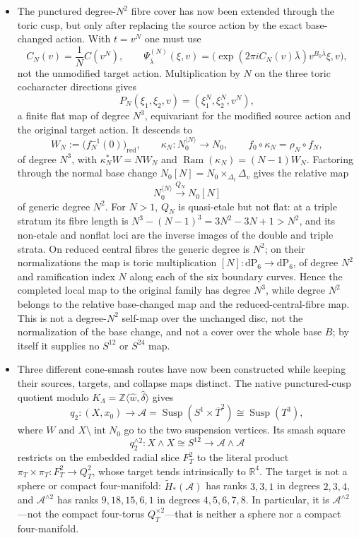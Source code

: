 \begin{itemize}[leftmargin=1.8em]
\item The punctured degree-$N^2$ fibre cover has now been extended through
the toric cusp, but only after replacing the source action by the exact
base-changed action.  With $t=v^N$ one must use
\[
 C_N(v)=\frac1N C(v^N),\qquad
 \Psi^{(N)}_{\bar\lambda}(\xi,v)
 =\bigl(\exp(2\pi iC_N(v)\bar\lambda)
         v^{B_0\bar\lambda}\xi,v\bigr),
\]
not the unmodified target action.  Multiplication by $N$ on the three
toric cocharacter directions gives
\[
 P_N(\xi_1,\xi_2,v)=(\xi_1^N,\xi_2^N,v^N),
\]
a finite flat map of degree $N^3$, equivariant for the modified source
action and the original target action.  It descends to
\[
 W_N:=\bigl(f_N^{-1}(0)\bigr)_{\mathrm{red}},\qquad
 \kappa_N:N_0^{\langle N\rangle}\longrightarrow N_0,
 \qquad f_0\circ\kappa_N=\rho_N\circ f_N,
\]
of degree $N^3$, with $\kappa_N^*W=NW_N$ and
$\operatorname{Ram}(\kappa_N)=(N-1)W_N$.  Factoring through the normal base
change $N_0[N]=N_0\times_{\Delta_t}\Delta_v$ gives the relative map
\[
 N_0^{\langle N\rangle}\xrightarrow{Q_N}N_0[N]
\]
of generic degree $N^2$.  For $N>1$, $Q_N$ is quasi-etale but not flat:
at a triple stratum its fibre length is
$N^3-(N-1)^3=3N^2-3N+1>N^2$, and its non-etale and nonflat loci are the
inverse images of the double and triple strata.  On reduced central fibres
the generic degree is $N^2$; on their normalizations the map is toric
multiplication $[N]:\mathrm{dP}_6\to\mathrm{dP}_6$, of degree $N^2$ and
ramification index $N$ along each of the six boundary curves.  Hence the
completed local map to the original family has degree $N^3$, while degree
$N^2$ belongs to the relative base-changed map and the reduced-central-fibre
map.  This is not a degree-$N^2$ self-map over the unchanged disc, not the
normalization of the base change, and not a cover over the whole base $B$;
by itself it supplies no $S^{12}$ or $S^{24}$ map.

\item Three different cone-smash routes have now been constructed while
keeping their sources, targets, and collapse maps distinct.  The native
punctured-cusp quotient modulo
$K_\Lambda=\mathbb Z\langle\widehat w,\widehat\delta\rangle$ gives
\[
 q_2:(X,x_0)\longrightarrow
 \mathcal A=\operatorname{Susp}(S^1\times\overline T^2)
             \cong\operatorname{Susp}(T^3),
\]
where $W$ and $X\setminus\operatorname{int}N_0$ go to the two suspension
vertices.  Its smash square
\[
 q_2^{\wedge2}:X\wedge X\cong S^{12}
 \longrightarrow\mathcal A\wedge\mathcal A
\]
restricts on the embedded radial slice $F_T^2$ to the literal product
$\pi_T\times\pi_T:F_T^2\to Q_T^2$, whose target tends intrinsically to
$\mathbb R^4$.  The target is not a sphere or compact four-manifold:
$\widetilde H_*(\mathcal A)$ has ranks $3,3,1$ in degrees $2,3,4$, and
$\mathcal A^{\wedge2}$ has ranks $9,18,15,6,1$ in degrees $4,5,6,7,8$.
In particular, it is $\mathcal A^{\wedge2}$---not the compact four-torus
$Q_T^{\times2}$---that is neither a sphere nor a compact four-manifold.


\end{itemize}
